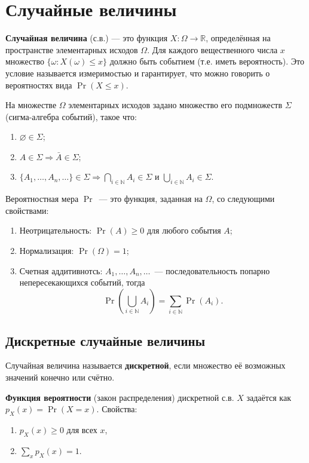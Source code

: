 \documentclass[10pt]{article}
\begin{document}
\section{Случайные величины}

\begin{definition}
\textbf{Случайная величина} (с.в.) — это функция $X: \Omega \to \mathbb{R}$, определённая на пространстве элементарных исходов $\Omega$. Для каждого вещественного числа $x$ множество $\{\omega: X(\omega) \le x\}$ должно быть событием (т.е. иметь вероятность). Это условие называется измеримостью и гарантирует, что можно говорить о вероятностях вида $\Pr(X \le x)$.
\end{definition}

\begin{definition}
На множестве $\Omega$ элементарных исходов задано множество его подмножеств $\Sigma$ (сигма-алгебра событий), такое что:
\begin{enumerate}
    \item $\varnothing \in \Sigma$;
    \item $A \in \Sigma \Rightarrow \bar{A} \in \Sigma$;
    \item $\{A_1, \dots, A_n, \dots\} \in \Sigma \Rightarrow \bigcap_{i\in \mathbb{N}} A_i \in \Sigma$ и $\bigcup_{i \in \mathbb{N}} A_i \in \Sigma$.
\end{enumerate}
Вероятностная мера $\Pr$~--- это функция, заданная на $\Omega$, со
следующими свойствами:
\begin{enumerate}
\item Неотрицательность: $\Pr(A) \geq 0$ для любого события $A$;
\item Нормализация: $\Pr(\Omega) = 1$;
\item Счетная аддитивнотсь: $A_1, \dots, A_n, \dots$~--- последовательность
попарно непересекающихся событий, тогда $$
\Pr(\bigcup_{i\in \mathbb{N}} A_i) = \sum_{i\in \mathbb{N}}\Pr(A_i)\text{.}$$
\end{enumerate}
\end{definition}

\subsection{Дискретные случайные величины}
Случайная величина называется \textbf{дискретной}, если множество её возможных значений конечно или счётно.

\begin{definition}
\textbf{Функция вероятности} (закон распределения) дискретной с.в. $X$ задаётся как $p_X(x) = \Pr(X = x)$. 
Свойства:
\begin{enumerate}
    \item $p_X(x) \ge 0$ для всех $x$,
    \item $\sum_{x} p_X(x) = 1$.
\end{enumerate}
\end{definition}
\end{document}
